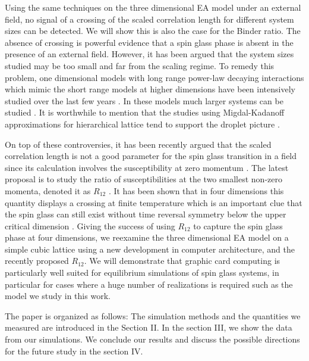 Using the same techniques on the three dimensional EA model under an external field, no signal of 
a crossing of the scaled correlation length for different system sizes can be 
detected\cite{Young-Katzgraber2004}.  We will show this is also 
the case for the Binder ratio.  The absence of crossing is powerful evidence that a spin
glass phase is absent in the presence of an external field. However, it has been 
argued that the system sizes studied may be too small and far from the scaling 
regime. To remedy this problem, one dimensional models with long range power-law 
decaying interactions \cite{Kotliar-Anderson-Stein-1983} which mimic the short range models 
at higher dimensions have been intensively studied over the last few years \cite{Katzgraber-Young-2003a,Katzgraber-Young-2003b,
Leuzzi-1999}. In these models much larger systems can be studied \cite{Katzgraber-Larson-Young-2009,
Katzgraber-Hartmann-2009,Leuzzi-etal-2008,Larson-etal-2013}. It is worthwhile to mention that
the studies using Migdal-Kadanoff approximations for hierarchical lattice
tend to support the droplet picture \cite{Moore-Bokil-Drossel-1998,Migliorini-Berker-1998}. 

On top of these controversies, it has been recently argued that the scaled correlation length 
is not a good parameter for the spin glass transition in a field since its calculation involves 
the susceptibility at zero momentum \cite{Leuzzi-etal-2008}.
The latest proposal is to study the ratio of susceptibilities at the 
two smallest non-zero momenta, denoted it as $R_{12}$ \cite{Banos-2012}. It has 
been shown that in four dimensions this quantity displays a crossing
at finite temperature which is an important clue that the spin glass can still 
exist without time reversal symmetry below the upper critical dimension \cite{Banos-2012}. 
Giving the success of using $R_{12}$ to capture the spin glass phase
at four dimensions, we reexamine the three dimensional EA model on a simple cubic lattice using 
a new development in computer architecture, and the recently proposed $R_{12}$. 
We will demonstrate that graphic card computing is particularly well suited for 
equilibrium simulations of spin glass systems, in particular for cases where a huge number 
of realizations is required such as the model we study in this work. 

The paper is organized as follows: The simulation methods and the quantities we measured 
are introduced in the Section II. In the section III, we show the data from our simulations.
We conclude our results and discuss the possible directions for the future study in the
section IV.


